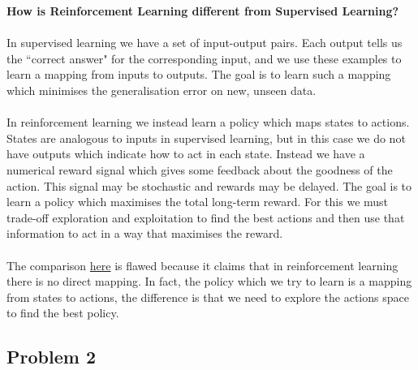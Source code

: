 \documentclass[a4paper,11pt]{article}
\numberwithin{equation}{section}
\theoremstyle{remark}
\begin{document}
\textbf{How is Reinforcement Learning different from Supervised Learning?}
\\ \\
In supervised learning we have a set of input-output pairs. Each output tells us the ``correct answer" for the corresponding input, and we use these examples to learn a mapping from inputs to outputs. The goal is to learn such a mapping which minimises the generalisation error on new, unseen data.
\\ \\
In reinforcement learning we instead learn a policy which maps states to actions. States are analogous to inputs in supervised learning, but in this case we do not have outputs which indicate how to act in each state. Instead we have a numerical reward signal which gives some feedback about the goodness of the action. This signal may be stochastic and rewards may be delayed. The goal is to learn a policy which maximises the total long-term reward. For this we must trade-off exploration and exploitation to find the best actions and then use that information to act in a way that maximises the reward. 
\\ \\
The comparison \href{https://www.analyticsvidhya.com/blog/2017/01/introduction-to-reinforcement-learning-implementation/}{here} is flawed because it claims that in reinforcement learning there is no direct mapping. In fact, the policy which we try to learn is a mapping from states to actions, the difference is that we need to explore the actions space to find the best policy. 

\subsection{Problem 2}
\end{document}
